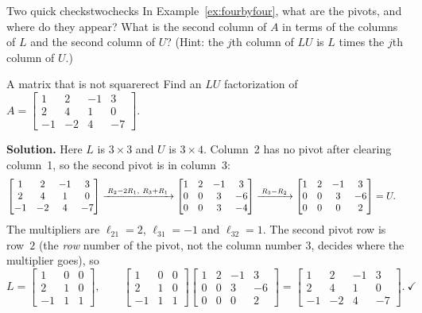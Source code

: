 \documentclass[11pt]{article}
\begin{document}
\begin{kc}{Two quick checks}{twochecks}
In Example~\ref{ex:fourbyfour}, what are the pivots, and where do they appear? What is the second column of $A$ in terms of the columns of $L$ and the second column of $U$? (Hint: the $j$th column of $LU$ is $L$ times the $j$th column of $U$.)
\end{kc}

\begin{exmp}{A matrix that is not square}{rect}
Find an $LU$ factorization of $A=\begin{bmatrix}1&2&-1&3\\2&4&1&0\\-1&-2&4&-7\end{bmatrix}$.

\textbf{Solution.} Here $L$ is $3\times3$ and $U$ is $3\times4$. Column~2 has no pivot after clearing column~1, so the second pivot is in column~3:
\begin{align*}
\begin{bmatrix}1&2&-1&3\\2&4&1&0\\-1&-2&4&-7\end{bmatrix}
&\xrightarrow{\;R_2-2R_1,\ R_3+R_1\;}
\begin{bmatrix}1&2&-1&3\\0&0&3&-6\\0&0&3&-4\end{bmatrix}
\xrightarrow{\;R_3-R_2\;}
\begin{bmatrix}1&2&-1&3\\0&0&3&-6\\0&0&0&2\end{bmatrix}=U .
\end{align*}
The multipliers are $\ell_{21}=2$, $\ell_{31}=-1$ and $\ell_{32}=1$. The second pivot row is row~$2$ (the \emph{row} number of the pivot, not the column number $3$, decides where the multiplier goes), so
\[
L=\begin{bmatrix}1&0&0\\2&1&0\\-1&1&1\end{bmatrix},\qquad
\begin{bmatrix}1&0&0\\2&1&0\\-1&1&1\end{bmatrix}\begin{bmatrix}1&2&-1&3\\0&0&3&-6\\0&0&0&2\end{bmatrix}=\begin{bmatrix}1&2&-1&3\\2&4&1&0\\-1&-2&4&-7\end{bmatrix}.\ \checkmark
\]
\end{exmp}
\end{document}
